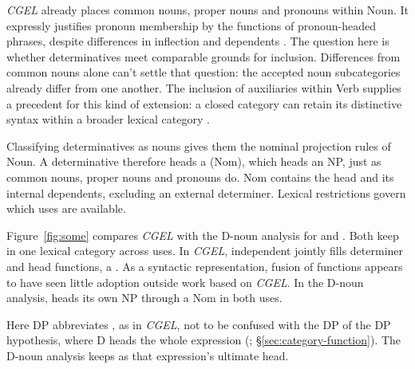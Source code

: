 \documentclass[12pt]{article}
\begin{document}
\textit{CGEL} already places common nouns, proper nouns and pronouns within Noun. It expressly justifies pronoun membership by the functions of pronoun-headed phrases, despite differences in inflection and dependents \citep[327--328]{huddleston2002}. The question here is whether determinatives meet comparable grounds for inclusion. Differences from common nouns alone can't settle that question: the accepted noun subcategories already differ from one another. The inclusion of auxiliaries within Verb supplies a precedent for this kind of extension: a closed category can retain its distinctive syntax within a broader lexical category \citep{pullumwilson1977}.

Classifying determinatives as nouns gives them the nominal projection rules of Noun. A determinative therefore heads a  (Nom), which heads an NP, just as common nouns, proper nouns and pronouns do. Nom contains the head and its internal dependents, excluding an external determiner. Lexical restrictions govern which uses are available.

Figure~\ref{fig:some} compares \textit{CGEL} with the D-noun analysis for  and . Both keep  in one lexical category across uses. In \textit{CGEL}, independent  jointly fills determiner and head functions, a  \citep[410--412]{huddleston2002}. As a syntactic representation, fusion of functions appears to have seen little adoption outside work based on \textit{CGEL}. In the D-noun analysis,  heads its own NP through a Nom in both uses.

Here DP abbreviates , as in \textit{CGEL}, not to be confused with the DP of the DP hypothesis, where D heads the whole expression  (\citealp{abney1987}; §\ref{sec:category-function}). The D-noun analysis keeps  as that expression's ultimate head.
\end{document}
